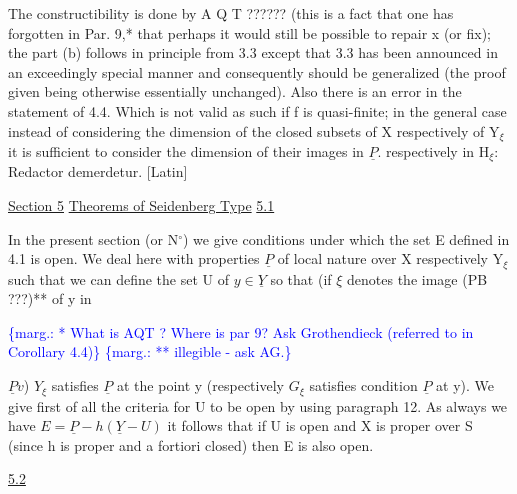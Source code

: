 \documentclass[11pt]{article}
\newcommand{\scanpage}[1]{\par\bigskip\noindent{\small\sffamily[scan #1]}\par}
\newcommand{\mspage}[1]{{\small\sffamily[p.\,#1]}}
\newcommand{\margin}[1]{\textcolor{blue}{\{\textsf{marg.:} #1\}}}
\newcommand{\uline}[1]{\underline{#1}}
\begin{document}
The constructibility is done by A Q T ?????? (this is a fact
that one has forgotten in Par. 9,* that perhaps it would still be
possible to repair x (or fix); the part (b) follows in principle
from 3.3 except that 3.3 has been announced in an exceedingly
special manner and consequently should be generalized (the proof
given being otherwise essentially unchanged). Also there is an
error in the statement of 4.4. Which is not valid as such if f is
quasi-finite; in the general case instead of considering the
dimension of the closed subsets of X respectively of Y$_{\xi}$ it is
sufficient to consider the dimension of their images in $\underline{P}$.
respectively in H$_{\xi}$:
Redactor demerdetur. [Latin]

\uline{Section 5} \uline{Theorems of Seidenberg Type}
\uline{5.1}

In the present section (or N$^{\circ}$) we give conditions under which
the set E defined in 4.1 is open. We deal here with properties $\underline{P}$
of local nature over X respectively Y$_{\xi}$ such that we can define the
set U of $y \in \underline{Y}$ so that (if $\xi$ denotes the image (PB ???)** of y in

\margin{* What is AQT ? Where is par 9? Ask Grothendieck (referred to
in Corollary 4.4)}
\margin{** illegible - ask AG.}

\clearpage
\scanpage{24/26}
\mspage{26}

$\underline{P}v$) $Y_{\xi}$ satisfies $\underline{P}$ at the point y (respectively $G_{\xi}$ satisfies
condition $\underline{P}$ at y).  We give first of all the criteria for U to be
open by using paragraph 12.  As always we have $E = \underline{P} - h(\underline{Y} - U)$ it
follows that if U is open and X is proper over S (since h is
proper and a fortiori closed) then E is also open.

\uline{5.2}
\end{document}
